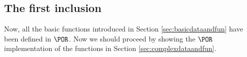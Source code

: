 \begin{comment}
\begin{remark}
The encoding of the initial state of a stream machine $\mcnfi$ is $\langle \langle\rangle_\oone, \overline \zero_\oone, tenc(\sone), \overline \zero_\oone\rangle_\oone$
\end{remark}

\begin{lemma}
There exists a $\POR$ function that, given the encoding $\mu$ of a stream machine $M$ and a configuration of such machine $c$, returns the next configuration reached by the machine:
\end{lemma}
\end{comment}
\subsection{The first inclusion}
Now, all the basic functions introduced in Section \ref{sec:basicdataandfun} have been defined in $\POR$. Now we should proceed by showing the $\POR$ implementation of the functions in Section \ref{sec:complexdataandfun}.

